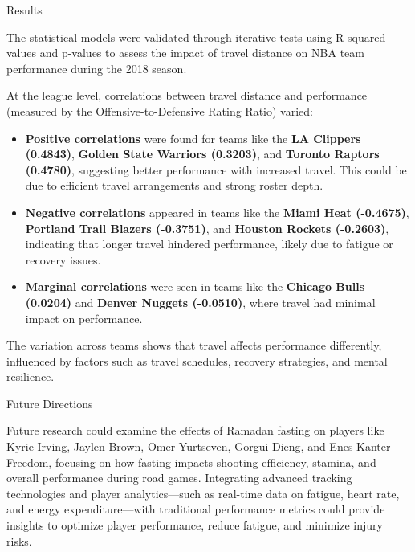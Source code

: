 \documentclass[final]{beamer}
\newlength{\colwidth}
\begin{document}
\begin{frame}[t]
\begin{columns}[t]
\begin{column}{\colwidth}

  \begin{block}{Results}

    The statistical models were validated through iterative tests using R-squared values and p-values to assess the impact of travel distance on NBA team performance during the 2018 season.

At the league level, correlations between travel distance and performance (measured by the Offensive-to-Defensive Rating Ratio) varied:

\begin{itemize}
    \item \textbf{Positive correlations} were found for teams like the \textbf{LA Clippers (0.4843)}, \textbf{Golden State Warriors (0.3203)}, and \textbf{Toronto Raptors (0.4780)}, suggesting better performance with increased travel. This could be due to efficient travel arrangements and strong roster depth.
    \item \textbf{Negative correlations} appeared in teams like the \textbf{Miami Heat (-0.4675)}, \textbf{Portland Trail Blazers (-0.3751)}, and \textbf{Houston Rockets (-0.2603)}, indicating that longer travel hindered performance, likely due to fatigue or recovery issues.
    \item \textbf{Marginal correlations} were seen in teams like the \textbf{Chicago Bulls (0.0204)} and \textbf{Denver Nuggets (-0.0510)}, where travel had minimal impact on performance.
\end{itemize}

The variation across teams shows that travel affects performance differently, influenced by factors such as travel schedules, recovery strategies, and mental resilience.

  \end{block}

  \begin{block}{Future Directions}

    Future research could examine the effects of Ramadan fasting on players like Kyrie Irving, Jaylen Brown, Omer Yurtseven, Gorgui Dieng, and Enes Kanter Freedom, focusing on how fasting impacts shooting efficiency, stamina, and overall performance during road games. Integrating advanced tracking technologies and player analytics—such as real-time data on fatigue, heart rate, and energy expenditure—with traditional performance metrics could provide insights to optimize player performance, reduce fatigue, and minimize injury risks.



\end{block}
\end{column}
\end{columns}
\end{frame}
\end{document}
